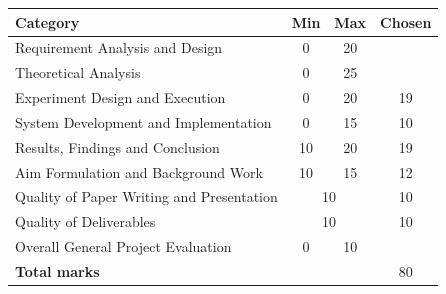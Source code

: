 \documentclass{sig-alternate-05-2015}
\begin{document}
	\renewcommand{\arraystretch}{1.25}
	\begin{tabular}{|l|c|c|c|}
		\hline
		\textbf{Category} & \textbf{Min} & \textbf{Max} & \textbf{Chosen} \\ \hline \hline
		Requirement Analysis and Design & 0 & 20 &
		 \\ \hline
		Theoretical Analysis & 0 & 25 &
		 \\ \hline
		Experiment Design and Execution & 0 & 20 &
		19 \\ \hline
		System Development and Implementation & 0 & 15 &
		10 \\ \hline
		Results, Findings and Conclusion & 10 & 20 &
		19 \\ \hline
		Aim Formulation and Background Work & 10 & 15 &
		12 \\ \hline
		Quality of Paper Writing and Presentation & \multicolumn{2}{c|}{10} &
		10 \\ \hline
		Quality of Deliverables & \multicolumn{2}{c|}{10} &
		10 \\ \hline
		Overall General Project Evaluation & 0 & 10 &
		\\ \hline
		\hline
		\multicolumn{3}{|l|}{\textbf{Total marks}} & 80 \\ \hline
	\end{tabular}
	
	\endgroup
	\thispagestyle{empty}
	\newpage
	\setcounter{page}{1}
	
	
	
	
	
	
	
	
	
\end{document}

